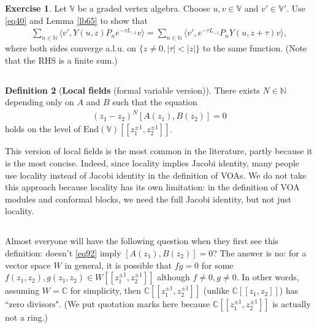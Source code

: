 \documentclass[11pt,b5paper,notitlepage]{article}
\theoremstyle{definition}
\newtheorem{df}{Definition}[section]
\newtheorem{exe}[df]{Exercise}
\theoremstyle{plain}
\newcommand{\End}{\mathrm{End}} %
\newcommand{\bigbk}[1]{\big\langle {#1}\big\rangle}
\newcommand{\Vbb}{\mathbb V}
\newcommand{\Cbb}{\mathbb C}
\newcommand{\Nbb}{\mathbb N}
\numberwithin{equation}{section}
\begin{document}
\begin{exe}\label{lb89}
Let $\Vbb$ be a graded vertex algebra. Choose $u,v\in\Vbb$ and $v'\in\Vbb'$.  Use \eqref{eq40} and Lemma \ref{lb65} to show that
\begin{align}
\sum_{n\in\Nbb}\bigbk{v',Y(u,z)P_ne^{-\tau L_{-1}}v}=\sum_{n\in\Nbb}\bigbk{v',e^{-\tau L_{-1}}P_nY(u,z+\tau)v},
\end{align}
where both sides converge a.l.u. on $\{z\neq 0,|\tau|<|z|\}$ to the same function. (Note that the RHS is a finite sum.)
\end{exe}



\subsection{}


\begin{df}[\textbf{Local fields} (formal variable version)]
There exists $N\in\Nbb$ depending only on $A$ and $B$ such that the equation
\begin{align}
(z_1-z_2)^N[A(z_1),B(z_2)]=0\label{eq92}	
\end{align}
holds on the level of $\End(\Vbb)[[z_1^{\pm1},z_2^{\pm1}]]$.
\end{df}

This version of local fields is the most common in the literature, partly because it is the most concise. Indeed, since locality implies Jacobi identity, many people use locality instead of Jacobi identity in the definition of VOAs. We do not take this approach because locality has its own limitation: in the definition of VOA modules and conformal blocks, we need the full Jacobi identity, but not just locality.


\subsection{}\label{lb64}

Almost everyone will have the following question when they first see this definition: doesn't \eqref{eq92} imply $[A(z_1),B(z_2)]=0$? The answer is no: for a vector space $W$ in general, it is possible that $fg=0$ for some $f(z_1,z_2),g(z_1,z_2)\in W[[z_1^{\pm1},z_2^{\pm1}]]$ although $f\neq 0,g\neq 0$. In other words, assuming $W=\Cbb$ for simplicity, then $\Cbb[[z_1^{\pm1},z_2^{\pm1}]]$ (unlike $\Cbb[[z_1,z_2]]$) has ``zero divisors". (We put quotation marks here because $\Cbb[[z_1^{\pm1},z_2^{\pm1}]]$ is actually not a ring.)
\end{document}

